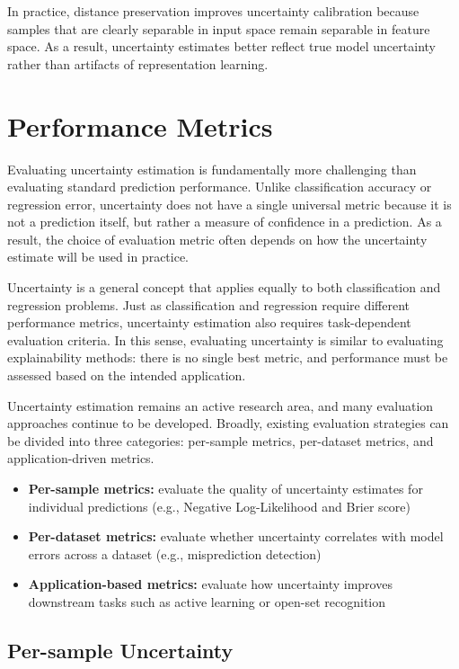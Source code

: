 \documentclass{article}
\begin{document}
In practice, distance preservation improves uncertainty calibration because samples that are clearly separable in input space remain separable in feature space. As a result, uncertainty estimates better reflect true model uncertainty rather than artifacts of representation learning.

\section{Performance Metrics}

Evaluating uncertainty estimation is fundamentally more challenging than evaluating standard prediction performance. Unlike classification accuracy or regression error, uncertainty does not have a single universal metric because it is not a prediction itself, but rather a measure of confidence in a prediction. As a result, the choice of evaluation metric often depends on how the uncertainty estimate will be used in practice.

Uncertainty is a general concept that applies equally to both classification and regression problems. Just as classification and regression require different performance metrics, uncertainty estimation also requires task-dependent evaluation criteria. In this sense, evaluating uncertainty is similar to evaluating explainability methods: there is no single best metric, and performance must be assessed based on the intended application.

Uncertainty estimation remains an active research area, and many evaluation approaches continue to be developed. Broadly, existing evaluation strategies can be divided into three categories: per-sample metrics, per-dataset metrics, and application-driven metrics.

\begin{itemize}
    \item \textbf{Per-sample metrics:} evaluate the quality of uncertainty estimates for individual predictions (e.g., Negative Log-Likelihood and Brier score)
    \item \textbf{Per-dataset metrics:} evaluate whether uncertainty correlates with model errors across a dataset (e.g., misprediction detection)
    \item \textbf{Application-based metrics:} evaluate how uncertainty improves downstream tasks such as active learning or open-set recognition
\end{itemize}

\subsection{Per-sample Uncertainty}
\end{document}
